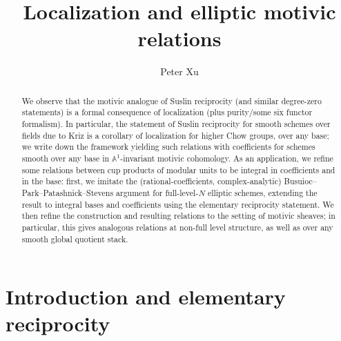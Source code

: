 \documentclass[a4paper,reqno,11pt]{amsart}
\theoremstyle{plain}
\theoremstyle{definition}
\theoremstyle{remark}
\newcommand{\A}{\mathbb{A}}
\begin{document}
 

\title[Localization and motivic relations]{Localization and elliptic motivic relations}
\author{Peter Xu}


\begin{abstract}
We observe that the motivic analogue of Suslin reciprocity (and similar degree-zero statements) is a formal consequence of localization (plus purity/some six functor formalism). In particular, the statement of Suslin reciprocity for smooth schemes over fields due to Kriz is a corollary of localization for higher Chow groups, over any base; we write down the framework yielding such relations with coefficients for schemes smooth over any base in $\A^1$-invariant motivic cohomology. As an application, we refine some relations between cup products of modular units to be integral in coefficients and in the base: first, we imitate the (rational-coefficients, complex-analytic) Busuioc--Park--Patashnick--Stevens argument for full-level-$N$ elliptic schemes, extending the result to integral bases and coefficients using the elementary reciprocity statement. We then refine the construction and resulting relations to the setting of motivic sheaves; in particular, this gives analogous relations at non-full level structure, as well as over any smooth global quotient stack.
\end{abstract}

\maketitle
\tableofcontents

\section{Introduction and elementary reciprocity}
\end{document}

